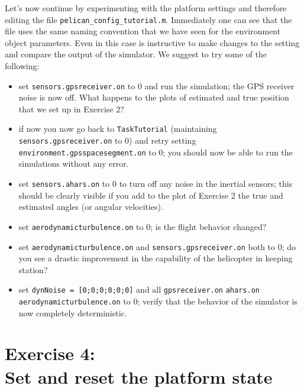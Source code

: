 \documentclass[a4paper,11pt]{article}
\begin{document}
Let's now continue by experimenting with the platform settings and therefore editing the file \texttt{pelican\_config\_tutorial.m}.
Immediately one can see that the file uses the same naming convention that we have seen for the environment object parameters. 
Even in this case is instructive to make changes to the setting and compare the output of the simulator. We suggest to try some of the following:
\begin{itemize}
 \item set \texttt{sensors.gpsreceiver.on} to $0$ and run the simulation; the GPS receiver noise is now off. What happens to the plots of estimated and true position that we set up in Exercise 2?
\item if now you now go back to \texttt{TaskTutorial} (maintaining \texttt{sensors.gpsreceiver.on} to $0$) and retry setting \texttt{environment.gpsspacesegment.on} to $0$; you should now be able to run the simulations without any error.
\item set \texttt{sensors.ahars.on} to $0$ to turn off any noise in the inertial sensors; this should be clearly visible if you add to the plot of Exercise 2 the true and estimated angles (or angular velocities). 
\item set \texttt{aerodynamicturbulence.on} to $0$; is the flight behavior changed?
\item set \texttt{aerodynamicturbulence.on} and \texttt{sensors.gpsreceiver.on} both to $0$; do you see a drastic improvement in the capability of the helicopter in keeping station?
\item set \texttt{dynNoise = [0;0;0;0;0;0]} and all \texttt{gpsreceiver.on} \texttt{ahars.on} \texttt{aerodynamicturbulence.on} to $0$; verify that the behavior of the simulator is now completely deterministic.
\end{itemize}

\section*{Exercise 4:\\Set and reset the platform state}
\end{document}
